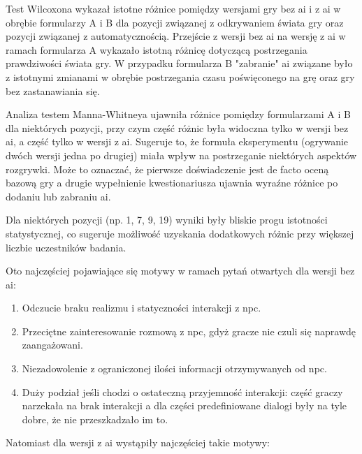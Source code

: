 \newpage

Test Wilcoxona wykazał istotne różnice pomiędzy wersjami gry bez \gls{ai} i z \gls{ai} w obrębie formularzy A i B
dla pozycji związanej z odkrywaniem świata gry oraz pozycji związanej z automatycznością. Przejście z
wersji bez \gls{ai} na wersję z \gls{ai} w ramach formularza A wykazało istotną różnicę dotyczącą postrzegania
prawdziwości świata gry. W przypadku formularza B "zabranie" \gls{ai} związane było z istotnymi zmianami
w obrębie postrzegania czasu poświęconego na grę oraz gry bez zastanawiania się.

Analiza testem Manna-Whitneya ujawniła różnice pomiędzy formularzami A i B dla niektórych pozycji, przy
czym część różnic była widoczna tylko w wersji bez \gls{ai}, a część tylko w wersji z \gls{ai}. Sugeruje to, że formuła
eksperymentu (ogrywanie dwóch wersji jedna po drugiej) miała wpływ na postrzeganie niektórych aspektów
rozgrywki. Może to oznaczać, że pierwsze doświadczenie jest de facto oceną bazową gry a drugie wypełnienie
kwestionariusza ujawnia wyraźne różnice po dodaniu lub zabraniu \gls{ai}.

Dla niektórych pozycji (np. 1, 7, 9, 19) wyniki były bliskie progu istotności statystycznej, co
sugeruje możliwość uzyskania dodatkowych różnic przy większej liczbie uczestników badania.

\vspace{10pt}

Oto najczęściej pojawiające się motywy w ramach pytań otwartych dla wersji bez \gls{ai}:

\begin{enumerate}
    \item Odczucie braku realizmu i statyczności interakcji z \gls{npc}.
    \item Przeciętne zainteresowanie rozmową z \gls{npc}, gdyż gracze nie czuli się naprawdę zaangażowani.
    \item Niezadowolenie z ograniczonej ilości informacji otrzymywanych od \gls{npc}.
    \item Duży podział jeśli chodzi o ostateczną przyjemność interakcji: część graczy
          narzekała na brak interakcji a dla części predefiniowane dialogi były na tyle dobre,
          że nie przeszkadzało im to.
\end{enumerate}

Natomiast dla wersji z \gls{ai} wystąpiły najczęściej takie motywy:

